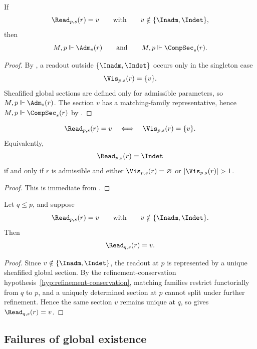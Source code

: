 \begin{proposition}\label{prop:address-before-value}
If
\[
\Read_{p,s}(r)=v
\qquad\text{with}\qquad
v\notin\{\Inadm,\Indet\},
\]
then
\[
M,p\Vdash \Adm_s(r)
\qquad\text{and}\qquad
M,p\Vdash \CompSec_s(r).
\]
\end{proposition}

\begin{proof}
By , a readout outside $\{\Inadm,\Indet\}$ occurs only in the singleton case
\[
\Vis_{p,s}(r)=\{v\}.
\]
Sheafified global sections are defined only for admissible parameters, so $M,p\Vdash \Adm_s(r)$. The section $v$ has a matching-family representative, hence $M,p\Vdash \CompSec_s(r)$ by .
\end{proof}

\begin{corollary}\label{cor:nonnull-readout-criterion}
\[
\Read_{p,s}(r)=v
\quad\Longleftrightarrow\quad
\Vis_{p,s}(r)=\{v\}.
\]
Equivalently,
\[
\Read_{p,s}(r)=\Indet
\]
if and only if $r$ is admissible and either $\Vis_{p,s}(r)=\varnothing$ or $|\Vis_{p,s}(r)|>1$.
\end{corollary}

\begin{proof}
This is immediate from .
\end{proof}

\begin{proposition}\label{prop:typed-readout-persistence}
Let $q\le p$, and suppose
\[
\Read_{p,s}(r)=v
\qquad\text{with}\qquad
v\notin\{\Inadm,\Indet\}.
\]
Then
\[
\Read_{q,s}(r)=v.
\]
\end{proposition}

\begin{proof}
Since $v\notin\{\Inadm,\Indet\}$, the readout at $p$ is represented by a unique sheafified global section. By the refinement-conservation hypothesis~\ref{hyp:refinement-conservation}, matching families restrict functorially from $q$ to $p$, and a uniquely determined section at $p$ cannot split under further refinement. Hence the same section $v$ remains unique at $q$, so  gives $\Read_{q,s}(r)=v$.
\end{proof}

\subsection{Failures of global existence}

